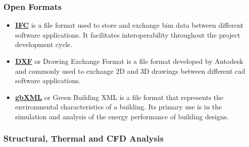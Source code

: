 \documentclass[a4paper, 12pt]{report}
\begin{document}
\subsubsection{Open Formats}\label{subsec:open-formats}

\begin{itemize}

\item \href{https://github.com/buildingSMART/IFC4.3.x-development}{\textbf{IFC}} is a file format used to store and exchange \acrshort{bim} data between different software applications. It facilitates interoperability throughout the project development cycle.

\item \href{https://www.autodesk.com/developer-network/platform-technologies/autocad-dxf-archive}{\textbf{DXF}} or Drawing Exchange Format is a file format developed by Autodesk and commonly used to exchange 2D and 3D drawings between different \acrshort{cad} software applications.

\item \href{https://www.gbxml.org/}{\textbf{gbXML}} or Green Building XML is a file format that represents the environmental characteristics of a building. Its primary use is in the simulation and analysis of the energy performance of building designs.

\end{itemize}

\subsubsection{Structural, Thermal and CFD Analysis}\label{subsec:structural-thermal-and-cfd-analysis}
\end{document}
